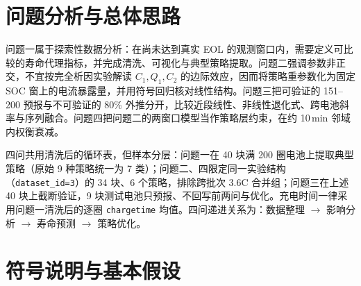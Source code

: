\documentclass[a4paper,12pt,UTF8,zihao=-4]{ctexart}
\begin{document}
\section{问题分析与总体思路}

问题一属于探索性数据分析：在尚未达到真实 EOL 的观测窗口内，需要定义可比较的寿命代理指标，并完成清洗、可视化与典型策略提取。问题二强调参数非正交，不宜按完全析因实验解读 \(C_1,Q_1,C_2\) 的边际效应，因而将策略重参数化为固定 SOC 窗上的电流暴露量，并用符号回归核对线性结构。问题三把可验证的 151--200 预报与不可验证的 80\% 外推分开，比较近段线性、非线性退化式、跨电池斜率与序列融合。问题四把问题二的两窗口模型当作策略层约束，在约 10\,min 邻域内权衡衰减。

四问共用清洗后的循环表，但样本分层：问题一在 40 块满 200 圈电池上提取典型策略（原始 9 种策略统一为 7 类）；问题二、四限定同一实验结构（\texttt{dataset\_id=3}）的 34 块、6 个策略，排除跨批次 \(3.6\mathrm{C}\) 合并组；问题三在上述 40 块上截断验证，9 块测试电池只预报、不回写前两问与优化。充电时间一律采用问题一清洗后的逐圈 \texttt{chargetime} 均值。四问递进关系为：数据整理 \(\rightarrow\) 影响分析 \(\rightarrow\) 寿命预测 \(\rightarrow\) 策略优化。

\section{符号说明与基本假设}
\end{document}
